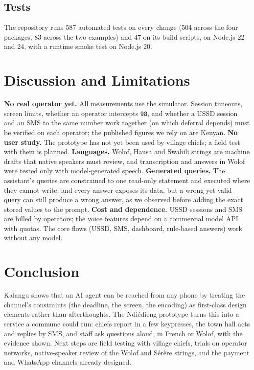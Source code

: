 \documentclass[conference]{IEEEtran}
\begin{document}
\subsection{Tests}
The repository runs 587 automated tests on every change (504 across the four
packages, 83 across the two examples) and 47 on its build scripts, on Node.js
22 and 24, with a runtime smoke test on Node.js 20.

\section{Discussion and Limitations}
\label{sec:limits}

\textbf{No real operator yet.} All measurements use the simulator. Session
timeouts, screen limits, whether an operator intercepts \texttt{98}, and
whether a USSD session and an SMS to the same number work together
(on which deferral depends) must be verified on each operator; the published
figures we rely on are Kenyan. \textbf{No user study.} The prototype has not
yet been used by village chiefs; a field test with them is planned.
\textbf{Languages.} Wolof, Hausa and Swahili strings are machine drafts that
native speakers must review, and transcription and answers in Wolof were
tested only with model-generated speech. \textbf{Generated queries.} The
assistant's queries are constrained to one read-only statement and executed
where they cannot write, and every answer exposes its data, but a wrong yet
valid query can still produce a wrong answer, as we observed before adding
the exact stored values to the prompt. \textbf{Cost and dependence.} USSD
sessions and SMS are billed by operators; the voice features depend on a
commercial model API with quotas. The core flows (USSD, SMS, dashboard,
rule-based answers) work without any model.

\section{Conclusion}

Kalangu shows that an AI agent can be reached from any phone by treating the
channel's constraints (the deadline, the screen, the encoding) as first-class
design elements rather than afterthoughts. The Ndi\'edieng prototype turns
this into a service a commune could run: chiefs report in a few keypresses,
the town hall acts and replies by SMS, and staff ask questions aloud, in
French or Wolof, with the evidence shown. Next steps are field testing with
village chiefs, trials on operator networks, native-speaker review of the
Wolof and S\'er\`ere strings, and the payment and WhatsApp channels already
designed.
\end{document}
